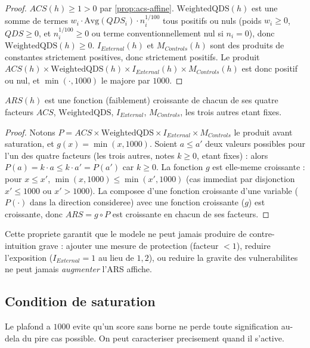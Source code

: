 \begin{proof}
$ACS(h)\ge 1>0$ par \cref{prop:acs-affine}. $\mathrm{WeightedQDS}(h)$ est une somme de
termes $w_i\cdot\mathrm{Avg}(QDS_i)\cdot n_i^{1/100}$ tous positifs ou nuls (poids
$w_i\ge0$, $QDS\ge0$, et $n_i^{1/100}\ge0$ ou terme conventionnellement nul si
$n_i=0$), donc $\mathrm{WeightedQDS}(h)\ge0$. $I_{External}(h)$ et $M_{Controls}(h)$
sont des produits de constantes strictement positives, donc strictement positifs.
Le produit $ACS(h)\times\mathrm{WeightedQDS}(h)\times I_{External}(h)\times
M_{Controls}(h)$ est donc positif ou nul, et $\min(\cdot,1000)$ le majore par $1000$.
\end{proof}

\begin{propriete}[Monotonie]
\label{prop:ars-mono}
$ARS(h)$ est une fonction (faiblement) croissante de chacun de ses quatre facteurs
$ACS$, $\mathrm{WeightedQDS}$, $I_{External}$, $M_{Controls}$, les trois autres etant
fixes.
\end{propriete}

\begin{proof}
Notons $P = ACS\times \mathrm{WeightedQDS}\times I_{External}\times M_{Controls}$ le
produit avant saturation, et $g(x)=\min(x,1000)$. Soient $a\le a'$ deux valeurs
possibles pour l'un des quatre facteurs (les trois autres, notes $k\ge0$, etant
fixes) : alors $P(a) = k\cdot a \le k\cdot a' = P(a')$ car $k\ge0$. La fonction
$g$ est elle-meme croissante : pour $x\le x'$, $\min(x,1000)\le\min(x',1000)$ (cas
immediat par disjonction $x'\le1000$ ou $x'>1000$). La composee d'une fonction
croissante d'une variable ($P(\cdot)$ dans la direction consideree) avec une fonction
croissante ($g$) est croissante, donc $ARS = g\circ P$ est croissante en chacun de
ses facteurs.
\end{proof}

Cette propriete garantit que le modele ne peut jamais produire de contre-intuition
grave : ajouter une mesure de protection (facteur $<1$), reduire l'exposition
($I_{External}=1$ au lieu de $1{,}2$), ou reduire la gravite des vulnerabilites ne
peut jamais \emph{augmenter} l'ARS affiche.

\subsection{Condition de saturation}

Le plafond a $1000$ evite qu'un score sans borne ne perde toute signification
au-dela du pire cas possible. On peut caracteriser precisement quand il s'active.

